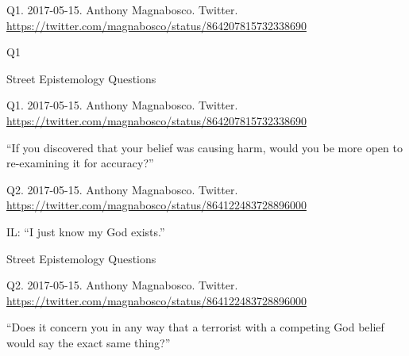 \documentclass[
    src/templates/5x2-on-a4paper,
    frame
]{flashcards}
\newcommand{\myheader}{}
\newcommand{\myfooter}{
    \begin{flushright}
        \small\sc
        Street Epistemology Questions \par
    \end{flushright}
}
\begin{document}
        \renewcommand{\myheader}{
            \normalfont %
            \begin{tiny}
                Q1.
                2017-05-15.
                Anthony Magnabosco.
                    Twitter.
                    \\
                    \url{ https://twitter.com/magnabosco/status/864207815732338690 }
                \par
            \end{tiny}
        }
        \begin{flashcard}{
            \myheader
            \vspace{\fill}
            \begin{center}
                \large
                    Q1
            \end{center}
            \vspace{\fill}
            \myfooter
            \vspace{-1.4ex}
        }
            \myheader
            \vspace{\fill}
            \begin{center}
                \large
\enquote{If you discovered that your belief was causing harm, would you be more open to re-examining it for accuracy?}            \end{center}
            \vspace{\fill}
        \end{flashcard}
        \renewcommand{\myheader}{
            \normalfont %
            \begin{tiny}
                Q2.
                2017-05-15.
                Anthony Magnabosco.
                    Twitter.
                    \\
                    \url{ https://twitter.com/magnabosco/status/864122483728896000 }
                \par
            \end{tiny}
        }
        \begin{flashcard}{
            \myheader
            \vspace{\fill}
            \begin{center}
                \large
                    IL: \enquote{I just know my God exists.}                    %
            \end{center}
            \vspace{\fill}
            \myfooter
            \vspace{-1.4ex}
        }
            \myheader
            \vspace{\fill}
            \begin{center}
                \large
\enquote{Does it concern you in any way that a terrorist with a competing God belief would say the exact same thing?}            \end{center}
            \vspace{\fill}
        \end{flashcard}
\end{document}
